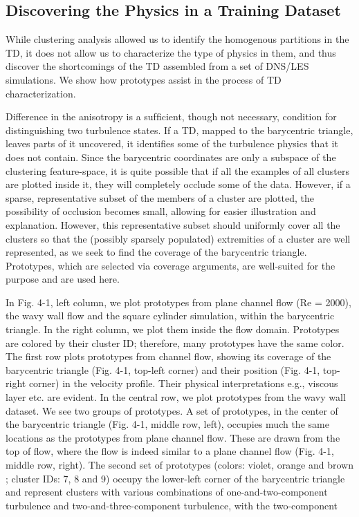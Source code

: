 \subsection{Discovering the Physics in a Training Dataset}

While clustering analysis allowed us to identify the homogenous partitions in the TD, it does not allow us to characterize the type of physics in them, and thus discover the shortcomings of the TD assembled from a set of DNS/LES simulations. We show how prototypes assist in the process of TD characterization.

Difference in the anisotropy is a sufﬁcient, though not necessary, condition for distinguishing two
turbulence states. If a TD, mapped to the barycentric triangle, leaves parts of it uncovered, it identiﬁes some of the turbulence physics that it does not contain. Since the barycentric coordinates are only a subspace of the clustering feature-space, it is quite possible that if all the examples of all clusters are plotted inside it, they will completely occlude some of the data. However, if a sparse, representative subset of the members of a cluster are plotted, the possibility of occlusion becomes small, allowing for easier illustration and explanation. However, this representative subset should uniformly cover all the clusters so that the (possibly sparsely populated) extremities of a cluster are well represented, as we seek to ﬁnd the coverage of the barycentric triangle. Prototypes, which are selected via coverage arguments, are well-suited for the purpose and are used here.

In Fig. 4-1, left column, we plot prototypes from plane channel ﬂow (Re = 2000), the wavy wall ﬂow and
the square cylinder simulation, within the barycentric triangle. In the right column, we plot them inside the
ﬂow domain. Prototypes are colored by their cluster ID; therefore, many prototypes have the same color.
The ﬁrst row plots prototypes from channel ﬂow, showing its coverage of the barycentric triangle (Fig. 4-1,
top-left corner) and their position (Fig. 4-1, top-right corner) in the velocity proﬁle. Their physical
interpretations e.g., viscous layer etc. are evident. In the central row, we plot prototypes from the wavy
wall dataset. We see two groups of prototypes. A set of prototypes, in the center of the barycentric triangle
(Fig. 4-1, middle row, left), occupies much the same locations as the prototypes from plane channel ﬂow.
These are drawn from the top of ﬂow, where the ﬂow is indeed similar to a plane channel ﬂow (Fig. 4-1,
middle row, right). The second set of prototypes (colors: violet, orange and brown ; cluster IDs: 7, 8 and 9)
occupy the lower-left corner of the barycentric triangle and represent clusters with various combinations of
one-and-two-component turbulence and two-and-three-component turbulence, with the two-component

